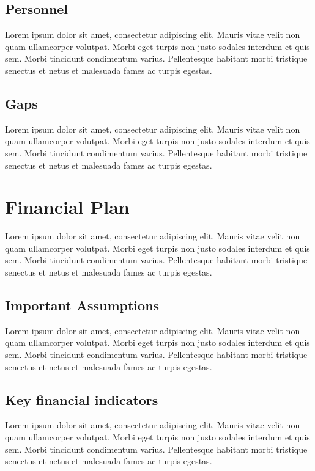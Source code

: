 \documentclass[11pt]{article}
\begin{document}
\subsection{Personnel}
Lorem ipsum dolor sit amet, consectetur adipiscing elit. Mauris vitae velit 
non quam ullamcorper volutpat. Morbi eget turpis non justo sodales interdum 
et quis sem. Morbi tincidunt condimentum varius. Pellentesque habitant morbi 
tristique senectus et netus et malesuada fames ac turpis egestas.\newline
\subsection{Gaps}
Lorem ipsum dolor sit amet, consectetur adipiscing elit. Mauris vitae velit 
non quam ullamcorper volutpat. Morbi eget turpis non justo sodales interdum 
et quis sem. Morbi tincidunt condimentum varius. Pellentesque habitant morbi 
tristique senectus et netus et malesuada fames ac turpis egestas.\newline
\pagebreak

\section{Financial Plan}
Lorem ipsum dolor sit amet, consectetur adipiscing elit. Mauris vitae velit 
non quam ullamcorper volutpat. Morbi eget turpis non justo sodales interdum 
et quis sem. Morbi tincidunt condimentum varius. Pellentesque habitant morbi 
tristique senectus et netus et malesuada fames ac turpis egestas.\newline
\subsection{Important Assumptions}
Lorem ipsum dolor sit amet, consectetur adipiscing elit. Mauris vitae velit 
non quam ullamcorper volutpat. Morbi eget turpis non justo sodales interdum 
et quis sem. Morbi tincidunt condimentum varius. Pellentesque habitant morbi 
tristique senectus et netus et malesuada fames ac turpis egestas.\newline
\subsection{Key financial indicators}
Lorem ipsum dolor sit amet, consectetur adipiscing elit. Mauris vitae velit 
non quam ullamcorper volutpat. Morbi eget turpis non justo sodales interdum 
et quis sem. Morbi tincidunt condimentum varius. Pellentesque habitant morbi 
tristique senectus et netus et malesuada fames ac turpis egestas.\newline
\end{document}
